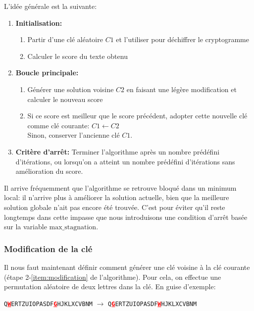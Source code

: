 \documentclass[a4paper]{article}
\newcommand{\highlight}[1]{\textbf{\textcolor{red}{\underline{#1}}}}
\begin{document}
L’idée générale est la suivante:
\begin{enumerate}
    \item \textbf{Initialisation:}
    \begin{enumerate}
        \item Partir d'une clé aléatoire $C1$ et l'utiliser pour déchiffrer le cryptogramme
        \item Calculer le score du texte obtenu
    \end{enumerate}
    \item \textbf{Boucle principale:}
    \begin{enumerate}[label= (\alph*)]
        \item\label{item:modification} Générer une solution voisine $C2$ en faisant une légère modification et calculer le nouveau score
        \item Si ce score est meilleur que le score précédent, adopter cette nouvelle clé comme clé courante: $C1 \leftarrow C2$\\
              Sinon, conserver l’ancienne clé $C1$.
    \end{enumerate}
    \item \textbf{Critère d'arrêt:} Terminer l'algorithme après un nombre prédéfini d'itérations, ou lorsqu'on a atteint un nombre prédéfini d'itérations sans amélioration du score.
\end{enumerate}

Il arrive fréquemment que l’algorithme se retrouve bloqué dans un minimum local: il n’arrive plus à améliorer la solution actuelle, bien que la meilleure solution globale n’ait pas encore été trouvée.  
C'est pour éviter qu'il reste longtemps dans cette impasse que nous introduisons une condition d'arrêt basée sur la variable \(\text{max\_stagnation}\).

\subsubsection*{Modification de la clé}\label{modification_cle}

Il nous faut maintenant définir comment générer une clé voisine à la clé courante (étape 2-\ref{item:modification} de l’algorithme).  
Pour cela, on effectue une permutation aléatoire de deux lettres dans la clé. En guise d'exemple:
\begin{center}
\texttt{Q\highlight{W}ERTZUIOPASDF\highlight{G}HJKLXCVBNM} $\rightarrow$ \texttt{Q\highlight{G}ERTZUIOPASDF\highlight{W}HJKLXCVBNM}
\end{center}
\end{document}
